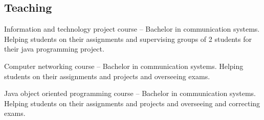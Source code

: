 \documentclass[11pt,a4paper,nolmodern]{moderncv}        %
\renewcommand*{\cventry}[6]{%
  \cvline{#1}{%
    {\bfseries#2}%
    \ifx#3\else{, {\itshape#3}}\fi%
    \ifx#4\else{, #4}\fi%
    \ifx#5\else{, #5}\fi%
    \ifx#6\else{\newline{}\begin{minipage}[t]{\linewidth}\small#6\end{minipage}}\fi
    }}%
\begin{document}

\subsection{Teaching}

{Information and technology project course -- Bachelor in communication systems. Helping students on their assignments and supervising groups of 2 students for their java programming project.}

{Computer networking course -- Bachelor in communication systems. Helping students on their assignments and projects and overseeing exams.}

{Java object oriented programming course -- Bachelor in communication systems. Helping students on their assignments and projects and overseeing and correcting exams.}{}
\end{document}
